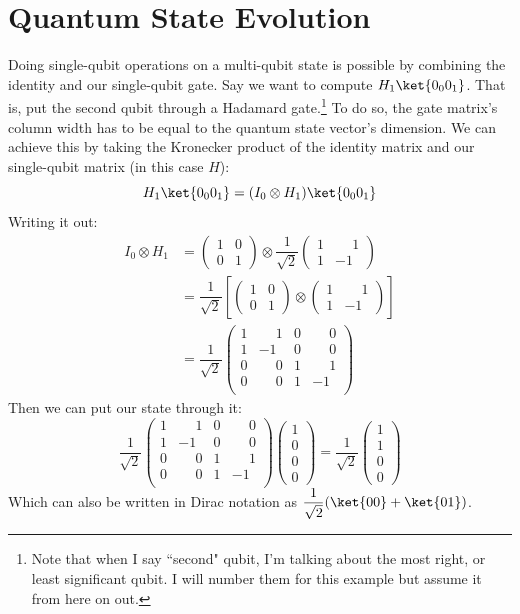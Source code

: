\documentclass[11pt, notitlepage]{report}
\newcommand{\igate}{
  \begin{pmatrix}
  1 & 0 \\
  0 & 1
  \end{pmatrix}
}
\newcommand{\hgate}{
  \dfrac{1}{\sqrt2}
  \begin{pmatrix}
  1 & \phantom{-}1 \\
  1 & -1
  \end{pmatrix}
}
\begin{document}
\section{Quantum State Evolution}
Doing single-qubit operations on a multi-qubit state is possible by combining the identity and our single-qubit gate. Say we want to compute $H_1\ket{0_0 0_1}$. That is, put the second qubit through a Hadamard gate.\footnote{Note that when I say ``second" qubit, I'm talking about the most right, or least significant qubit. I will number them for this example but assume it from here on out.} To do so, the gate matrix's column width has to be equal to the quantum state vector's dimension. We can achieve this by taking the Kronecker product of the identity matrix and our single-qubit matrix (in this case $H$):
\[
  H_1\ket{0_0 0_1} = (I_0 \otimes H_1)\ket{0_0 0_1}
\]
Writing it out:
\begin{align*}
  I_0 \otimes H_1 &=
  \igate{} \otimes \hgate{} \\
  &=
  \dfrac{1}{\sqrt2}
  \left[
  \igate{}
  \otimes
  \begin{pmatrix}
  1 & \phantom{-}1 \\
  1 & -1
  \end{pmatrix}
  \right] \\
  &= \dfrac{1}{\sqrt2}
  \begin{pmatrix}
  1 & \phantom{-}1 & 0 & \phantom{-}0 \\
  1 & -1 & 0 & \phantom{-}0 \\
  0 & \phantom{-}0 & 1 & \phantom{-}1 \\
  0 & \phantom{-}0 & 1 & -1 \\
  \end{pmatrix}
\end{align*}
Then we can put our  state through it:
\[
  \dfrac{1}{\sqrt2}
  \begin{pmatrix}
  1 & \phantom{-}1 & 0 & \phantom{-}0 \\
  1 & -1 & 0 & \phantom{-}0 \\
  0 & \phantom{-}0 & 1 & \phantom{-}1 \\
  0 & \phantom{-}0 & 1 & -1 \\
  \end{pmatrix}
  \begin{pmatrix}
  1 \\
  0 \\
  0 \\
  0
  \end{pmatrix}
  =
  \dfrac{1}{\sqrt2}
  \begin{pmatrix}
  1 \\
  1 \\
  0 \\
  0
  \end{pmatrix}
\]
Which can also be written in Dirac notation as $\dfrac{1}{\sqrt2}(\ket{00} + \ket{01})$.
\end{document}
